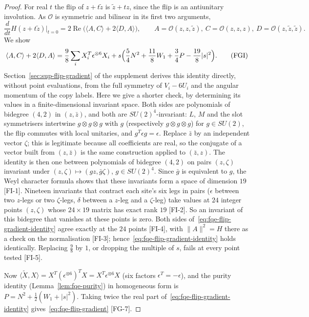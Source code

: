 \begin{proof}
For real $t$ the flip of $z+t\tilde z$ is $\tilde z+tz$, since the flip is an antiunitary involution. As
$\mathcal O$ is symmetric and bilinear in its first two arguments,
\[
 \frac{d}{dt}H(z+t\tilde z)\Big|_{t=0}=2\operatorname{Re}\bigl(\langle A,C\rangle+2\langle D,A\rangle\bigr),\qquad
 A=\mathcal O(z,z,\tilde z),\ C=\mathcal O(z,z,z),\ D=\mathcal O(z,\tilde z,\tilde z).
\]
We show
\[
 \langle A,C\rangle+2\langle D,A\rangle=\frac98\sum_iX_i^T\epsilon^{\otimes6}X_i
 +s\Bigl(\frac54N^2+\frac{11}8W_1+\frac34P-\frac{19}8|s|^2\Bigr).
 \tag{FGI}\label{eq:fqe-flip-gradient-identity}
\]
Section~\ref{sec:sup-flip-gradient} of the supplement derives this identity directly, without point evaluations, from the full
symmetry of $V_i-6U_i$ and the angular momentum of the copy labels. Here we give a shorter check, by determining its values in a
finite-dimensional invariant space.
Both sides are polynomials of bidegree $(4,2)$ in $(z,\bar z)$, and both are $SU(2)^{4}$-invariant: $L$, $M$ and the slot
symmetrisers intertwine $g\otimes g\otimes g$ with $g$ (respectively $g\otimes g\otimes g$) for $g\in SU(2)$, the flip commutes
with local unitaries, and $g^T\epsilon g=\epsilon$. Replace $\bar z$ by an independent vector $\zeta$; this is legitimate because
all coefficients are real, so the conjugate of a vector built from $(z,\bar z)$ is the same construction applied to $(\bar z,z)$.
The identity is then one between polynomials of bidegree $(4,2)$ on pairs $(z,\zeta)$ invariant under $(z,\zeta)\mapsto(gz,\bar g\zeta)$,
$g\in SU(2)^{4}$. Since $\bar g$ is equivalent to $g$, the Weyl character formula shows that these invariants form a space of
dimension $19$ [FI-1]. Nineteen invariants that contract each site's six legs in pairs ($\epsilon$ between two $z$-legs or two
$\zeta$-legs, $\delta$ between a $z$-leg and a $\zeta$-leg) take values at $24$ integer points $(z,\zeta)$ whose $24\times19$ matrix
has exact rank $19$ [FI-2]. So an invariant of this bidegree that vanishes at these points is zero. Both sides
of~\eqref{eq:fqe-flip-gradient-identity} agree exactly at the $24$ points [FI-4], with $\|A\|^2=H$ there as a check on the
normalisation [FI-3]; hence~\eqref{eq:fqe-flip-gradient-identity} holds identically. Replacing $\frac98$ by $1$, or dropping the
multiple of $s$, fails at every point tested [FI-5].

Now $\langle\tilde X,X\rangle=X^T(\epsilon^{\otimes6})^TX=X^T\epsilon^{\otimes6}X$ (six factors $\epsilon^T=-\epsilon$), and the
purity identity (Lemma~\ref{lem:fqe-purity}) in homogeneous form is $P=N^2+\frac12(W_1+|s|^2)$. Taking twice the real part
of~\eqref{eq:fqe-flip-gradient-identity} gives~\eqref{eq:fqe-flip-gradient} [FG-7].
\end{proof}

